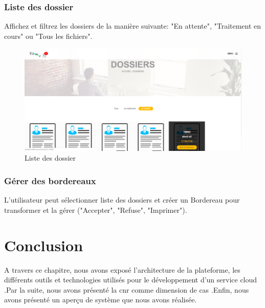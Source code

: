 \subsubsection{ Liste des dossier }
Affichez et filtrez les dossiers de la manière suivante: "En attente", "Traitement en cours" ou "Tous les fichiers".
\begin{figure}[H]
	\centering
	\includegraphics[width=1\linewidth]{images/captures/capturesuser/dossier}
	\caption{Liste des dossier}
	\label{fig:udossier}
\end{figure}


\subsubsection{ Gérer des  bordereaux }
L'utilisateur peut sélectionner liste des dossiers et créer un Bordereau pour transformer et la gérer ("Accepter", "Refuse", "Imprimer").

 





\section{Conclusion}

A travers ce chapitre, nous avons exposé l’architecture de la plateforme, les différents outils et technologies utilisés pour le développement d'un service cloud .Par la suite, nous avons présenté la \ac{cnr} comme dimension de cas .Enfin, nous avons présenté un aperçu de système que nous avons réalisée.

